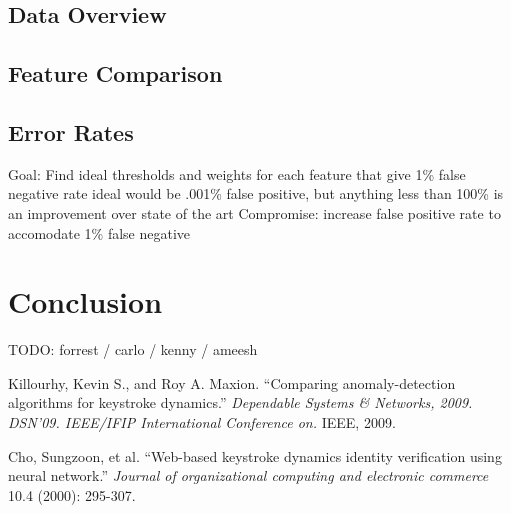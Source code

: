 \documentclass{article}
\begin{document}
\subsection{Data Overview}

\subsection{Feature Comparison} %


\subsection{Error Rates}    %

Goal: Find ideal thresholds and weights for each feature that give 1\% false negative rate
ideal would be  .001\% false positive, but anything less than 100\% is an improvement over state of the art
Compromise: increase false positive rate to accomodate 1\% false negative

\section{Conclusion}
TODO: forrest / carlo / kenny / ameesh


\begin{thebibliography}{99}
   Killourhy, Kevin S., and Roy A. Maxion. 
   ``Comparing anomaly-detection algorithms for keystroke dynamics.''
   \textit{Dependable Systems \& Networks, 2009. DSN'09. IEEE/IFIP International Conference on.}
   IEEE, 2009. 
 
   Cho, Sungzoon, et al.
   ``Web-based keystroke dynamics identity verification using neural network.'' 
   \textit{Journal of organizational computing and electronic commerce}
   10.4 (2000): 295-307.
  
\end{thebibliography}
\end{document}
